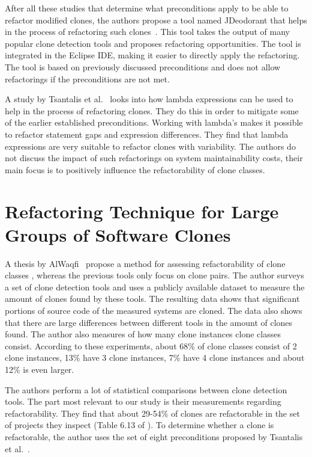 After all these studies that determine what preconditions apply to be able to refactor modified clones, the authors propose a tool named JDeodorant that helps in the process of refactoring such clones~\cite{mazinanian2016jdeodorant}. This tool takes the output of many popular clone detection tools \cite{kamiya2002ccfinder, deissenboeck2010flexible, jiang2007deckard, cordy2011nicad} and proposes refactoring opportunities. The tool is integrated in the Eclipse IDE, making it easier to directly apply the refactoring. The tool is based on previously discussed preconditions and does not allow refactorings if the preconditions are not met.

A study by Tsantalis et al.~\cite{tsantalis2017clone} looks into how lambda expressions can be used to help in the process of refactoring clones. They do this in order to mitigate some of the earlier established preconditions. Working with lambda's makes it possible to refactor statement gaps and expression differences. They find that lambda expressions are very suitable to refactor clones with variability. The authors do not discuss the impact of such refactorings on system maintainability costs, their main focus is to positively influence the refactorability of clone classes.

\section{Refactoring Technique for Large Groups of Software Clones}
A thesis by AlWaqfi~\cite{alwaqfi2017refactoring} propose a method for assessing refactorability of clone classes , whereas the previous tools only focus on clone pairs. The author surveys a set of clone detection tools \cite{kamiya2002ccfinder, baxter1999clonedr, jiang2007deckard, cordy2011nicad} and uses a publicly available dataset \cite{tsantalis2015assessing} to measure the amount of clones found by these tools. The resulting data shows that significant portions of source code of the measured systems are cloned. The data also shows that there are large differences between different tools in the amount of clones found. The author also measures of how many clone instances clone classes consist. According to these experiments, about 68\% of clone classes consist of 2 clone instances, 13\% have 3 clone instances, 7\% have 4 clone instances and about 12\% is even larger.

The authors perform a lot of statistical comparisons between clone detection tools. The part most relevant to our study is their measurements regarding refactorability. They find that about 29-54\% of clones are refactorable in the set of projects they inspect (Table 6.13 of \cite{alwaqfi2017refactoring}). To determine whether a clone is refactorable, the author uses the set of eight preconditions proposed by Tsantalis et al.~\cite{tsantalis2015assessing}.

